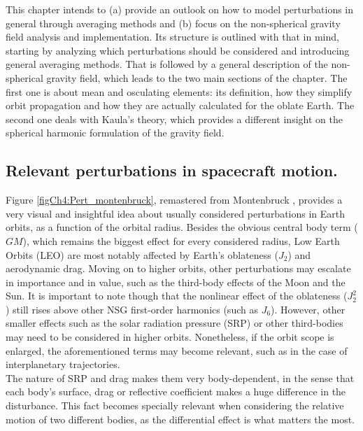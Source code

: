 %
\indent This chapter intends to (a) provide an outlook on how to model perturbations in general through averaging methods and (b) focus on the non-spherical gravity field analysis and implementation. Its structure is outlined with that in mind, starting by analyzing which perturbations should be considered and introducing general averaging methods. That is followed by a general description of the non-spherical gravity field, which leads to the two main sections of the chapter. The first one is about mean and osculating elements: its definition, how they simplify orbit propagation and how they are actually calculated for the oblate Earth. The second one deals with Kaula's theory, which provides a different insight on the spherical harmonic formulation of the gravity field.
%
	\subsection{Relevant perturbations in spacecraft motion.}
	\indent Figure \ref{figCh4:Pert_montenbruck}, remastered from Montenbruck \cite{Montenbruck}, provides a very visual and insightful idea about usually considered perturbations in Earth orbits, as a function of the orbital radius. Besides the obvious central body term ($GM$), which remains the biggest effect for every considered radius, Low Earth Orbits (LEO) are most notably affected by Earth's oblateness ($J_2$) and aerodynamic drag. Moving on to higher orbits, other perturbations may escalate in importance and in value, such as the third-body effects of the Moon and the Sun. It is important to note though that the nonlinear effect of the oblateness ($J_2^2$) still rises above other NSG first-order harmonics (such as $J_6$). However, other smaller effects such as the solar radiation pressure (SRP) or other third-bodies may need to be considered in higher orbits. Nonetheless, if the orbit scope is enlarged, the aforementioned terms may become relevant, such as in the case of interplanetary trajectories.\\
	\indent The nature of SRP and drag makes them very body-dependent, in the sense that each body's surface, drag or reflective coefficient makes a huge difference in the disturbance. This fact becomes specially relevant when considering the relative motion of two different bodies, as the differential effect is what matters the most.
